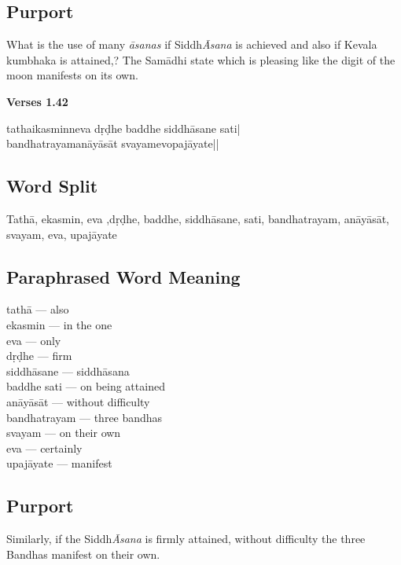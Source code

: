 \subsection*{Purport}

What is the use of many \textit{āsanas} if Siddh\textit{Āsana} is achieved and also if Kevala kumbhaka is attained,? The Samādhi state which is pleasing like the digit of the moon manifests on its own. 

\newpage
\noindent \textbf{Verses 1.42}

\begin{shloka}
tathaikasminneva dṛḍhe baddhe siddhāsane sati|\\
bandhatrayamanāyāsāt svayamevopajāyate||
\end{shloka}

\subsection*{Word Split}

Tathā, ekasmin, eva ,dṛḍhe, baddhe, siddhāsane, sati, bandhatrayam, anāyāsāt,  svayam, eva, upajāyate

\subsection*{Paraphrased Word Meaning}

\begin{multicols}{2}
\itemsep=0pt
tathā --- also \\	
ekasmin --- in the one  \\
eva --- only \\
dṛḍhe --- firm \\ 		 
siddhāsane --- siddhāsana	 \\
baddhe sati --- on being attained  \\
anāyāsāt ---  without difficulty  \\
bandhatrayam --- three bandhas	 \\
svayam --- on their own  \\
eva --- certainly  \\
upajāyate --- manifest 
\end{multicols}

\subsection*{Purport}

Similarly, if the Siddh\textit{Āsana} is firmly attained, without difficulty the three Bandhas manifest on their own.   

